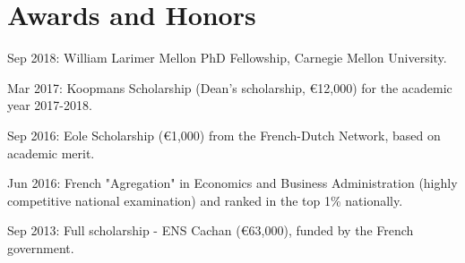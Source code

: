 \documentclass[letterpaper]{article}
\renewenvironment{itemize}{
  \begin{list}{}{
    \setlength{\leftmargin}{1.5em}
  }
}{
  \end{list}
}
\begin{document}
\section*{Awards and Honors}

\begin{itemize}
\item Sep 2018: William Larimer Mellon PhD Fellowship, Carnegie Mellon University.
\item Mar 2017: Koopmans Scholarship (Dean's scholarship, \euro 12,000) for the academic year 2017-2018.
\item Sep 2016: Eole Scholarship (\euro 1,000) from the French-Dutch Network, based on academic merit.
\item Jun 2016: French "Agregation" in Economics and Business Administration (highly competitive national examination) and ranked in the top 1\% nationally.
\item Sep 2013: Full scholarship - ENS Cachan (\euro 63,000), funded by the French government. 
\end{itemize}
\end{document}
